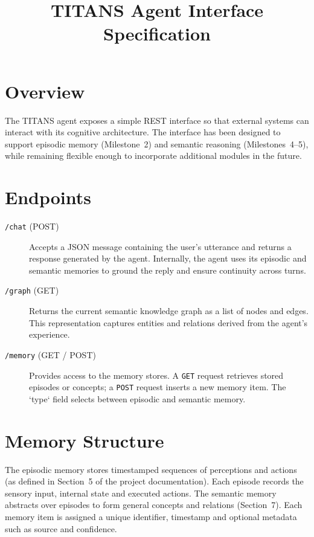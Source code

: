 \documentclass[letterpaper,twocolumn]{article}
\begin{document}
\title{TITANS Agent Interface Specification}
\maketitle

\section{Overview}

The TITANS agent exposes a simple REST interface so that external systems can interact with its cognitive architecture.  The interface has been designed to support episodic memory (Milestone~2) and semantic reasoning (Milestones~4–5), while remaining flexible enough to incorporate additional modules in the future.

\section{Endpoints}

\begin{description}
\item[\texttt{/chat} (POST)] Accepts a JSON message containing the user’s utterance and returns a response generated by the agent.  Internally, the agent uses its episodic and semantic memories to ground the reply and ensure continuity across turns.

\item[\texttt{/graph} (GET)] Returns the current semantic knowledge graph as a list of nodes and edges.  This representation captures entities and relations derived from the agent’s experience.

\item[\texttt{/memory} (GET / POST)] Provides access to the memory stores.  A \texttt{GET} request retrieves stored episodes or concepts; a \texttt{POST} request inserts a new memory item.  The `type` field selects between episodic and semantic memory.
\end{description}

\section{Memory Structure}

The episodic memory stores timestamped sequences of perceptions and actions (as defined in Section~5 of the project documentation).  Each episode records the sensory input, internal state and executed actions.  The semantic memory abstracts over episodes to form general concepts and relations (Section~7).  Each memory item is assigned a unique identifier, timestamp and optional metadata such as source and confidence.
\end{document}
